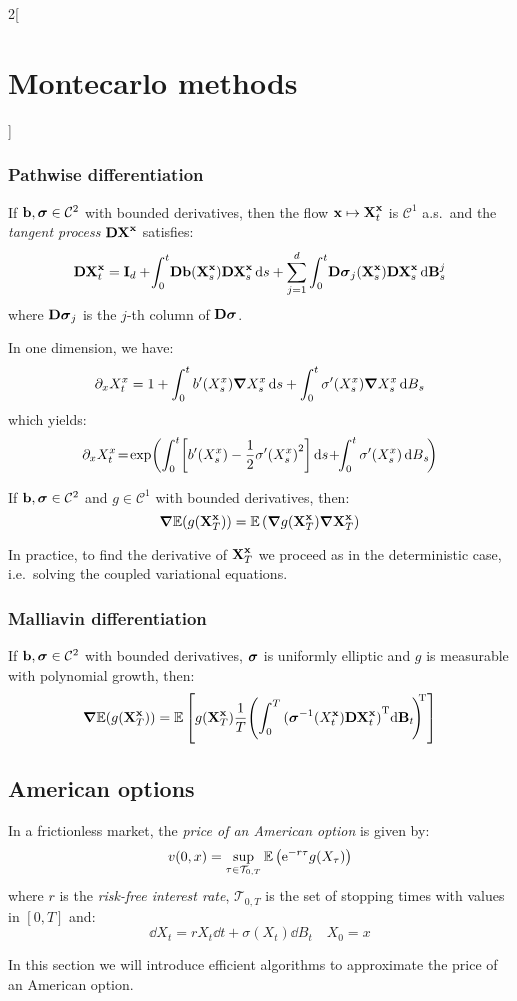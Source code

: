 \documentclass[../../../main_math.tex]{subfiles}
\begin{document}
\begin{multicols}{2}[\section{Montecarlo methods}]
  \subsubsection{Pathwise differentiation}
  \begin{theorem}
    If $\boldsymbol{\mathrm{b}},\boldsymbol{\mathrm{\sigma}}\in \mathcal{C}^2$ with bounded derivatives, then the flow ${\boldsymbol{\mathrm{x}}}\mapsto \boldsymbol{\mathrm{X}}_t^{\boldsymbol{\mathrm{x}}}$ is $\mathcal{C}^1$ a.s.\ and the \emph{tangent process} $\boldsymbol{\mathrm{DX}}^{\boldsymbol{\mathrm{x}}}$ satisfies:
    $$
      \boldsymbol{\mathrm{DX}}^{\boldsymbol{\mathrm{x}}}_t=\boldsymbol{\mathrm{I}}_d+\!\int_0^t\! \boldsymbol{\mathrm{Db}}(\boldsymbol{\mathrm{X}}_s^{\boldsymbol{\mathrm{x}}})\boldsymbol{\mathrm{DX}}_s^{\boldsymbol{\mathrm{x}}}\dd{s}+\sum_{j=1}^{d}\int_0^t\! \boldsymbol{\mathrm{D\sigma}}_j(\boldsymbol{\mathrm{X}}_s^{\boldsymbol{\mathrm{x}}})\boldsymbol{\mathrm{DX}}_s^{\boldsymbol{\mathrm{x}}}\dd{\boldsymbol{\mathrm{B}}_s^j}
    $$
    where $\boldsymbol{\mathrm{D\sigma}}_j$ is the $j$-th column of $\boldsymbol{\mathrm{D\sigma}}$.
  \end{theorem}
  \begin{remark}
    In one dimension, we have:
    $$
      \partial_xX_t^x=1+\int_0^t b'(X_s^x)\grad X_s^x\dd{s}+\int_0^t \sigma'(X_s^x)\grad X_s^x\dd{B}_s
    $$
    which yields:
    $$
      \partial_xX_t^x\!=\!\expp{\int_0^t\!\left[b'(X_s^x)-\frac{1}{2}{\sigma'(X_s^x)}^2\right]\dd{s} \!+\!\! \int_0^t \sigma'(X_s^x)\dd{B}_s\!}
    $$
  \end{remark}
  \begin{proposition}
    If $\boldsymbol{\mathrm{b}},\boldsymbol{\mathrm{\sigma}}\in \mathcal{C}^2$ and $g\in\mathcal{C}^1$ with bounded derivatives, then:
    $$
      \grad \mathbb{E}(g(\boldsymbol{\mathrm{X}}_T^{\boldsymbol{\mathrm{x}}}))=\mathbb{E}\left(\grad g(\boldsymbol{\mathrm{X}}_T^{\boldsymbol{\mathrm{x}}})\grad \boldsymbol{\mathrm{X}}_T^{\boldsymbol{\mathrm{x}}}\right)
    $$
  \end{proposition}
  \begin{remark}
    In practice, to find the derivative of $\boldsymbol{\mathrm{X}}_T^{\boldsymbol{\mathrm{x}}}$ we proceed as in the deterministic case, i.e.\ solving the coupled variational equations.
  \end{remark}
  \subsubsection{Malliavin differentiation}
  \begin{proposition}
    If $\boldsymbol{\mathrm{b}},\boldsymbol{\mathrm{\sigma}}\in \mathcal{C}^2$ with bounded derivatives, $\boldsymbol{\mathrm{\sigma}}$ is uniformly elliptic and $g$ is measurable with polynomial growth, then:
    $$
      \grad \mathbb{E}(g(\boldsymbol{\mathrm{X}}_T^{\boldsymbol{\mathrm{x}}}))=\mathbb{E}\left[g(\boldsymbol{\mathrm{X}}_T^{\boldsymbol{\mathrm{x}}})\frac{1}{T}{\left(\int_0^T{(\boldsymbol{\mathrm{\sigma}}^{-1}(X_t^{\boldsymbol{\mathrm{x}}})\boldsymbol{\mathrm{DX}}_t^{\boldsymbol{\mathrm{x}}})}^{\mathrm{T}}\!\dd{\boldsymbol{\mathrm{B}}_t}\!\right)\!\!}^{\mathrm{T}}\right]
    $$
  \end{proposition}
  \subsection{American options}
  \begin{definition}
    In a frictionless market, the \emph{price of an American option} is given by:
    $$
      v(0,x)=\sup_{\tau\in\mathcal{T}_{0,T}}\mathbb{E}\left(\mathrm{e}^{-r\tau}g(X_\tau)\right)
    $$
    where $r$ is the \emph{risk-free interest rate}, $\mathcal{T}_{0,T}$ is the set of stopping times with values in $[0,T]$ and:
    $$
      \dd{X_t}=r X_t\dd{t}+\sigma (X_t)\dd{B}_t\quad X_0=x
    $$
  \end{definition}
  In this section we will introduce efficient algorithms to approximate the price of an American option.

\end{multicols}
\end{document}
